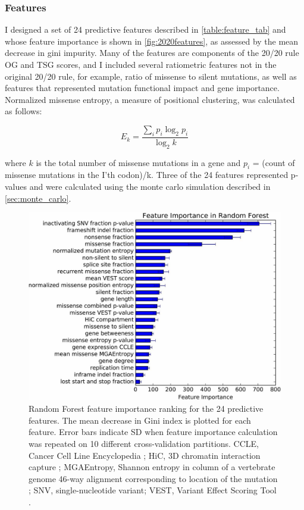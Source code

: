 \subsubsection{Features}

I designed a set of 24 predictive features described in \autoref{table:feature_tab} and whose feature importance is shown in \autoref{fig:2020features}, as assessed by the mean decrease in gini impurity. Many of the features are components of the 20/20 rule OG and TSG scores, and I included several ratiometric features not in the original 20/20 rule, for example, ratio of missense to silent mutations, as well as features that represented mutation functional impact and gene importance. Normalized missense entropy, a measure of positional clustering, was calculated as follows:

\begin{equation}
E_k = \frac{\sum_i{p_i\log_2{p_i}}}{\log_2{k}}
\end{equation}

where $k$ is the total number of missense mutations in a gene and $p_i$ = (count of missense mutations in the I'th codon)/k. Three of the 24 features represented p-values and were calculated using the monte carlo simulation described in \autoref{sec:monte_carlo}.

\begin{figure}
  \centering
  \makeatletter
  \let\@currsize\normalsize
  \includegraphics[width=0.9\linewidth]{figures/chapter3/feature_importance.jpg}
  \caption{Random Forest feature importance ranking for the 24 predictive features. The mean decrease in Gini index is plotted for each feature. Error bars indicate SD when feature importance calculation was repeated on 10 different cross-validation partitions. CCLE, Cancer Cell Line Encyclopedia \cite{RN13}; HiC, 3D chromatin interaction capture \cite{RN13}; MGAEntropy, Shannon entropy in column of a vertebrate genome 46-way alignment corresponding to location of the mutation \cite{RN90}; SNV, single-nucleotide variant; VEST, Variant Effect Scoring Tool \cite{RN30}.}
  \label{fig:2020features}
\end{figure}

